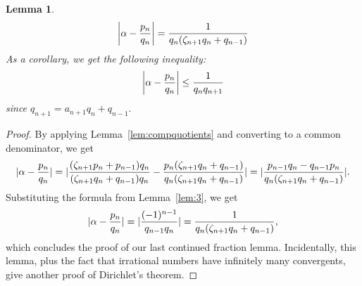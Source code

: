 \documentclass[12pt, letterpaper, oneside]{book}
\newcommand{\ga}{\ensuremath{\alpha}}
\newcommand{\gz}{\ensuremath{\zeta}}
\DeclarePairedDelimiter{\abs}{\lvert}{\rvert}
\theoremstyle{plain}
\newtheorem{lemma}[theorem]{Lemma}
\theoremstyle{definition}
\theoremstyle{remark}
\begin{document}
\begin{lemma}\label{lem:four}
  \[
    \abs*{\ga - \frac{p_n}{q_n}} = \frac{1}{q_n(\gz_{n+1}q_n+q_{n-1})}
  \]
  As a corollary, we get the following inequality:
  \[
  \abs*{\ga - \frac{p_n}{q_n}}\leq \frac{1}{q_nq_{n+1}}
  \]
  since $q_{n+1} = a_{n+1}q_n + q_{n-1}.$ 
\end{lemma}
\begin{proof}
  By applying Lemma~\ref{lem:compquotients} and converting to a common denominator, we get
  \[
    \abs{\ga - \frac{p_n}{q_n}} =
    \abs{\frac{(\gz_{n+1}p_n+p_{n-1})q_n}{(\gz_{n+1}q_n+q_{n-1})q_n} -
      \frac{p_n(\gz_{n+1}q_n+q_{n-1})}{q_n(\gz_{n+1}q_n+q_{n-1})}} =
    \abs{\frac{p_{n-1}q_n-q_{n-1}p_n}{q_n(\gz_{n+1}q_n+q_{n-1})}}.
  \]
  Substituting the formula from Lemma~\ref{lem:3}, we get
  \[
    \abs{\ga - \frac{p_n}{q_n}} = \abs{\frac{(-1)^{n-1}}{q_{n-1}q_n}}
    = \frac{1}{q_n(\gz_{n+1}q_n+q_{n-1})},
  \]
  which concludes the proof of our last continued fraction lemma. Incidentally, this lemma, plus the fact that irrational numbers have infinitely many convergents, give another proof of Dirichlet's theorem. 
\end{proof}
\end{document}
